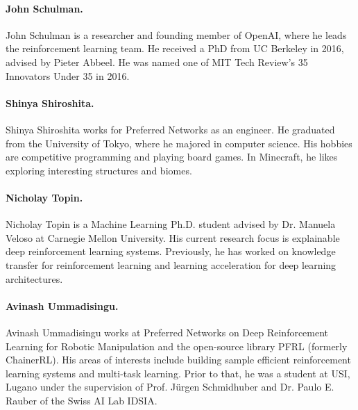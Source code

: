\paragraph{John Schulman.} John Schulman is a researcher and founding member of OpenAI, where he leads the reinforcement learning team. He received a PhD from UC Berkeley in 2016, advised by Pieter Abbeel. He was named one of MIT Tech Review’s 35 Innovators Under 35 in 2016.

\paragraph{Shinya Shiroshita.} 
Shinya Shiroshita works for Preferred Networks as an engineer. He graduated from the University of Tokyo, where he majored in computer science. His hobbies are competitive programming and playing board games. In Minecraft, he likes exploring interesting structures and biomes.

\paragraph{Nicholay Topin.} Nicholay Topin is a Machine Learning Ph.D. student advised by Dr. Manuela Veloso at Carnegie Mellon University. His current research focus is explainable deep reinforcement learning systems. Previously, he has worked on knowledge transfer for reinforcement learning and learning acceleration for deep learning architectures. 

\paragraph{Avinash Ummadisingu.} Avinash Ummadisingu works at Preferred Networks on Deep Reinforcement Learning for Robotic Manipulation and the open-source library PFRL (formerly ChainerRL). His areas of interests include building sample efficient reinforcement learning systems and multi-task learning. Prior to that, he was a student at USI, Lugano under the supervision of Prof. Jürgen Schmidhuber and Dr. Paulo E. Rauber of the Swiss AI Lab IDSIA.

